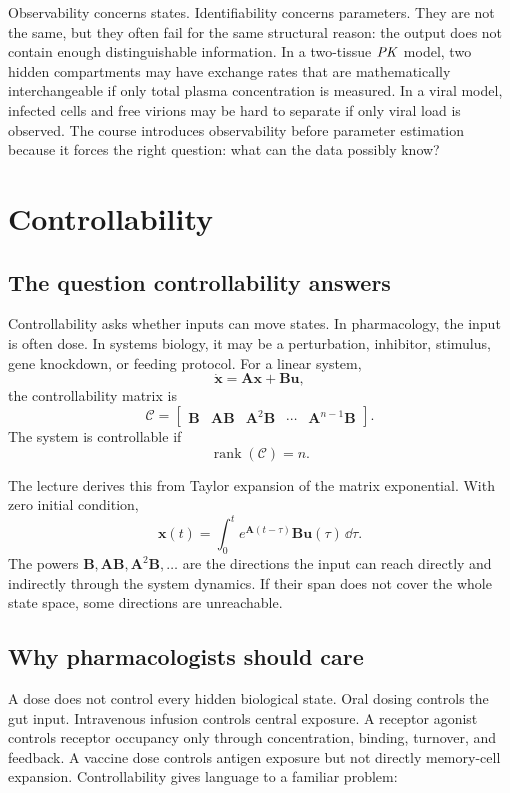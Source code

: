 \documentclass[a4paper]{article}
\DeclareMathOperator{\rank}{rank}
\newcommand{\vect}[1]{\boldsymbol{#1}}
\newcommand{\mat}[1]{\mathbf{#1}}
\newcommand{\A}{\mat A}
\newcommand{\B}{\mat B}
\newcommand{\Ctrb}{\mathcal C}
\newcommand{\PK}{\ensuremath{\pksym{PK}}}
\begin{document}
Observability concerns states. Identifiability concerns parameters. They are not the same, but they often fail for the same structural reason: the output does not contain enough distinguishable information. In a two-tissue \PK{} model, two hidden compartments may have exchange rates that are mathematically interchangeable if only total plasma concentration is measured. In a viral model, infected cells and free virions may be hard to separate if only viral load is observed. The course introduces observability before parameter estimation because it forces the right question: what can the data possibly know?

\section{Controllability}

\subsection{The question controllability answers}

Controllability asks whether inputs can move states. In pharmacology, the input is often dose. In systems biology, it may be a perturbation, inhibitor, stimulus, gene knockdown, or feeding protocol. For a linear system,
\[
  \dot{\vect x}=\A\vect x+\B\vect u,
\]
the controllability matrix is
\[
  \Ctrb=
  \begin{bmatrix}
  \B&\A\B&\A^2\B&\cdots&\A^{n-1}\B
  \end{bmatrix}.
\]
The system is controllable if
\[
  \rank(\Ctrb)=n.
\]

The lecture derives this from Taylor expansion of the matrix exponential. With zero initial condition,
\[
  \vect x(t)=\int_0^t e^{\A(t-\tau)}\B\vect u(\tau)\,\dd\tau.
\]
The powers \(\B,\A\B,\A^2\B,\ldots\) are the directions the input can reach directly and indirectly through the system dynamics. If their span does not cover the whole state space, some directions are unreachable.

\subsection{Why pharmacologists should care}

A dose does not control every hidden biological state. Oral dosing controls the gut input. Intravenous infusion controls central exposure. A receptor agonist controls receptor occupancy only through concentration, binding, turnover, and feedback. A vaccine dose controls antigen exposure but not directly memory-cell expansion. Controllability gives language to a familiar problem:
\begin{center}
\end{center}
\end{document}
